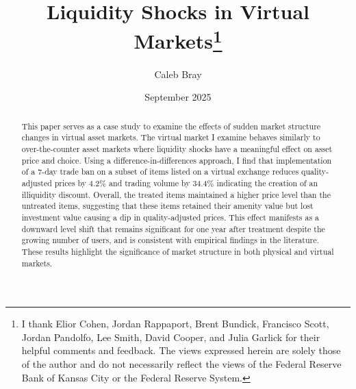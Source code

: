\documentclass[12pt,letterpaper]{article}
\begin{document}
\protected{}



\title{\vspace{-0.7in}\Large{\bf{Liquidity Shocks in Virtual Markets}}\thanks{I thank Elior Cohen, Jordan Rappaport, Brent Bundick, Francisco Scott, Jordan Pandolfo, Lee Smith, David Cooper, and Julia Garlick for their helpful comments and feedback. The views expressed herein are solely those of the author and do not necessarily reflect the views of the Federal Reserve Bank of Kansas City or the Federal Reserve System.  \newline}}%
\author{\vspace{5mm} Caleb Bray \\ \vspace{-0.8mm}}
\date{\normalsize{\hspace{0.1in}September 2025}}

\maketitle
\begin{abstract}
\noindent This paper serves as a case study to examine the effects of sudden market structure changes in virtual asset markets. The virtual market I examine behaves similarly to over-the-counter asset markets where liquidity shocks have a meaningful effect on asset price and choice. Using a difference-in-differences approach, I find that implementation of a 7-day trade ban on a subset of items listed on a virtual exchange reduces quality-adjusted prices by 4.2\% and trading volume by 34.4\% indicating the creation of an illiquidity discount. Overall, the treated items maintained a higher price level than the untreated items, suggesting that these items retained their amenity value but lost investment value causing a dip in quality-adjusted prices. This effect manifests as a downward level shift that remains significant for one year after treatment despite the growing number of users, and is consistent with empirical findings in the literature. These results highlight the significance of market structure in both physical and virtual markets.\\
\end{abstract}
 
\end{document}
